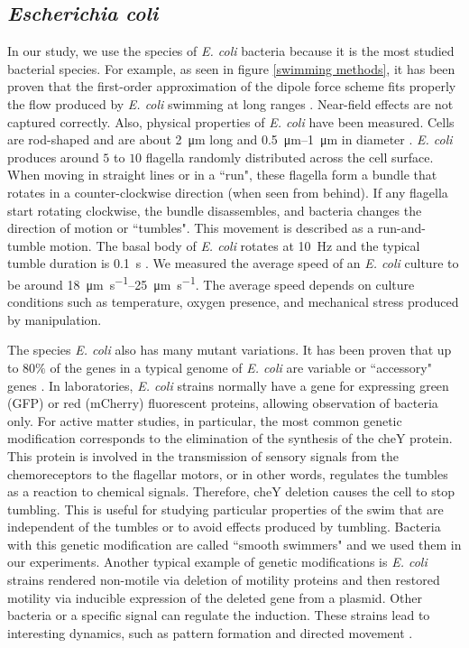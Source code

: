 \subsection{\textit{Escherichia coli}}

In our study, we use the species of \textit{E. coli} bacteria because it is the most studied bacterial species. For example, as seen in figure \ref{swimming methods}, it has been proven that the first-order approximation of the dipole force scheme fits properly the flow produced by  \textit{E. coli} swimming at long ranges \cite{Drescher2011FluidScattering}. Near-field effects are not captured correctly. Also, physical properties of \textit{E. coli} have been measured. Cells are rod-shaped and are about \SI{2}{\micro\meter} long and \SIrange[range-units=single]{0.5}{1}{\micro\meter} in diameter \cite{BritannicaOnlineEncyclopedia2021EducationEncyclopedia}. \textit{E. coli} produces around $5$ to $10$ flagella randomly distributed across the cell surface. When moving in straight lines or in a ``run", these flagella form a bundle that rotates in a counter-clockwise direction (when seen from behind). If any flagella start rotating clockwise, the bundle disassembles, and bacteria changes the direction of motion or ``tumbles". This movement is described as a run-and-tumble motion. The basal body of \textit{E. coli} rotates at \SI{10}{\hertz} and the typical tumble duration is \SI{0.1}{\second} \cite{Berg2001E.ColiMotion}. We measured the average speed of an \textit{E. coli} culture to be around \SIrange[range-units=single, per-mode = symbol]{18}{25}{\micro\meter \per \second}. The average speed depends on culture conditions such as temperature, oxygen presence, and mechanical stress produced by  manipulation. 

The species \textit{E. coli} also has many mutant variations. It has been proven that up to $80\%$ of the genes in a typical genome of \textit{E. coli} are variable or ``accessory" genes \cite{Lukjancenko2010ComparisonGenomes}. In laboratories, \textit{E. coli} strains normally have a gene for expressing green (GFP) or red (mCherry) fluorescent proteins, allowing observation of bacteria only. For active matter studies, in particular, the most common genetic modification corresponds to the elimination of the synthesis of the cheY protein. This protein is involved in the transmission of sensory signals from the chemoreceptors to the flagellar motors, or in other words, regulates the tumbles as a reaction to chemical signals. Therefore, cheY deletion causes the cell to stop tumbling. This is useful for studying particular properties of the swim that are independent of the tumbles or to avoid effects produced by tumbling. Bacteria with this genetic modification are called ``smooth swimmers" and we used them in our experiments. Another typical example of genetic modifications is \textit{E. coli} strains rendered non-motile via deletion of motility proteins and then restored motility via inducible expression of the deleted gene from a plasmid. Other bacteria or a specific signal can regulate the induction. These strains lead to interesting dynamics, such as pattern formation and directed movement \cite{Ravichandar2017TranscriptionalGradient, Curatolo2020CooperativeRegulation}.

